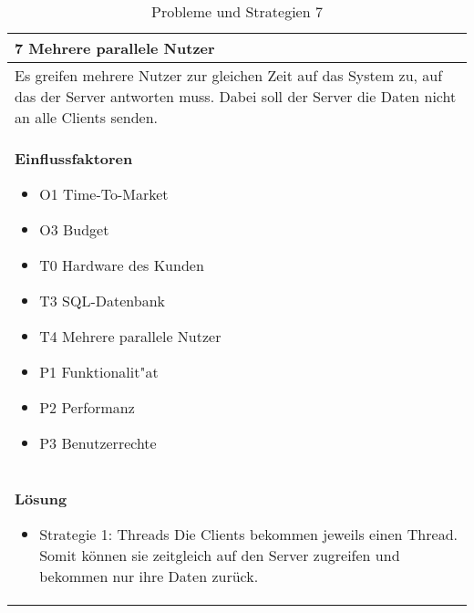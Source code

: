 \begin{table}[H]
\caption{Probleme und Strategien 7}
\begin{tabular}{|p{\textwidth}|}\hline
7 Mehrere parallele Nutzer\\ \hline
Es greifen mehrere Nutzer zur gleichen Zeit auf das System zu, auf das der Server antworten muss. Dabei soll der Server die Daten nicht an alle Clients senden.\\ \hline
\textbf{Einflussfaktoren}
\begin{itemize}
\item O1 Time-To-Market
\item O3 Budget
\item T0 Hardware des Kunden
\item T3 SQL-Datenbank
\item T4 Mehrere parallele Nutzer
\item P1 Funktionalit"at
\item P2 Performanz
\item P3 Benutzerrechte
\end{itemize}\\ \hline
\textbf{Lösung}
\begin{itemize}
\item Strategie 1: Threads \leavevmode\newline
Die Clients bekommen jeweils einen Thread. Somit können sie zeitgleich auf den Server zugreifen und bekommen nur ihre Daten zurück.
\end{itemize} \\ \hline
\end{tabular}
\end{table}

